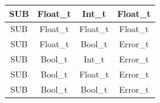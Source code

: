 \begin{figure}[H]
\begin{tabular}{cccc}
        \midrule SUB & Float\_t & Int\_t    & Float\_t \\
        \midrule SUB & Float\_t & Float\_t  & Float\_t \\
        \midrule SUB & Float\_t & Bool\_t   & Error\_t \\

        \midrule SUB & Bool\_t & Int\_t     & Error\_t \\
        \midrule SUB & Bool\_t & Float\_t   & Error\_t \\
        \midrule SUB & Bool\_t & Bool\_t    & Error\_t \\

        \bottomrule
    \end{tabular}\\
\end{figure}

\newpage

